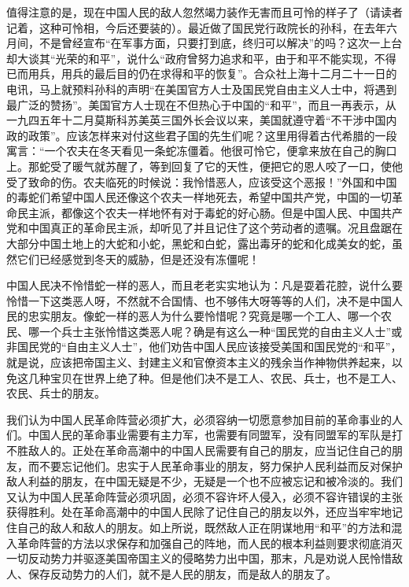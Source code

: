 值得注意的是，现在中国人民的敌人忽然竭力装作无害而且可怜的样子了（请读者记着，这种可怜相，今后还要装的）。最近做了国民党行政院长的孙科，在去年六月间，不是曾经宣布“在军事方面，只要打到底，终归可以解决”的吗？这次一上台却大谈其“光荣的和平”，说什么“政府曾努力追求和平，由于和平不能实现，不得已而用兵，用兵的最后目的仍在求得和平的恢复”。合众社上海十二月二十一日的电讯，马上就预料孙科的声明“在美国官方人士及国民党自由主义人士中，将遇到最广泛的赞扬”。美国官方人士现在不但热心于中国的“和平”，而且一再表示，从一九四五年十二月莫斯科苏美英三国外长会议以来，美国就遵守着“不干涉中国内政的政策”。应该怎样来对付这些君子国的先生们呢？这里用得着古代希腊的一段寓言：“一个农夫在冬天看见一条蛇冻僵着。他很可怜它，便拿来放在自己的胸口上。那蛇受了暖气就苏醒了，等到回复了它的天性，便把它的恩人咬了一口，使他受了致命的伤。农夫临死的时候说：我怜惜恶人，应该受这个恶报！”外国和中国的毒蛇们希望中国人民还像这个农夫一样地死去，希望中国共产党，中国的一切革命民主派，都像这个农夫一样地怀有对于毒蛇的好心肠。但是中国人民、中国共产党和中国真正的革命民主派，却听见了并且记住了这个劳动者的遗嘱。况且盘踞在大部分中国土地上的大蛇和小蛇，黑蛇和白蛇，露出毒牙的蛇和化成美女的蛇，虽然它们已经感觉到冬天的威胁，但是还没有冻僵呢！

中国人民决不怜惜蛇一样的恶人，而且老老实实地认为：凡是耍着花腔，说什么要怜惜一下这类恶人呀，不然就不合国情、也不够伟大呀等等的人们，决不是中国人民的忠实朋友。像蛇一样的恶人为什么要怜惜呢？究竟是哪一个工人、哪一个农民、哪一个兵士主张怜惜这类恶人呢？确是有这么一种“国民党的自由主义人士”或非国民党的“自由主义人士”，他们劝告中国人民应该接受美国和国民党的“和平”，就是说，应该把帝国主义、封建主义和官僚资本主义的残余当作神物供养起来，以免这几种宝贝在世界上绝了种。但是他们决不是工人、农民、兵士，也不是工人、农民、兵士的朋友。

我们认为中国人民革命阵营必须扩大，必须容纳一切愿意参加目前的革命事业的人们。中国人民的革命事业需要有主力军，也需要有同盟军，没有同盟军的军队是打不胜敌人的。正处在革命高潮中的中国人民需要有自己的朋友，应当记住自己的朋友，而不要忘记他们。忠实于人民革命事业的朋友，努力保护人民利益而反对保护敌人利益的朋友，在中国无疑是不少，无疑是一个也不应被忘记和被冷淡的。我们又认为中国人民革命阵营必须巩固，必须不容许坏人侵入，必须不容许错误的主张获得胜利。处在革命高潮中的中国人民除了记住自己的朋友以外，还应当牢牢地记住自己的敌人和敌人的朋友。如上所说，既然敌人正在阴谋地用“和平”的方法和混入革命阵营的方法以求保存和加强自己的阵地，而人民的根本利益则要求彻底消灭一切反动势力并驱逐美国帝国主义的侵略势力出中国，那末，凡是劝说人民怜惜敌人、保存反动势力的人们，就不是人民的朋友，而是敌人的朋友了。

